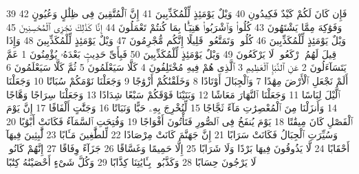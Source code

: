 {\tiny\colorbox{cl_aya}{39}} فَإِن كَانَ لَكُمْ كَيْدٌ فَكِيدُونِ
{\tiny\colorbox{cl_aya}{40}} وَيْلٌ يَوْمَئِذٍ لِّلْمُكَذِّبِينَ
{\tiny\colorbox{cl_aya}{41}} إِنَّ ٱلْمُتَّقِينَ فِى ظِلَٰلٍ وَعُيُونٍ
{\tiny\colorbox{cl_aya}{42}} وَفَوَٰكِهَ مِمَّا يَشْتَهُونَ
{\tiny\colorbox{cl_aya}{43}} كُلُوا۟ وَٱشْرَبُوا۟ هَنِيٓـًٔۢا بِمَا كُنتُمْ تَعْمَلُونَ
{\tiny\colorbox{cl_aya}{44}} إِنَّا كَذَٰلِكَ نَجْزِى ٱلْمُحْسِنِينَ
{\tiny\colorbox{cl_aya}{45}} وَيْلٌ يَوْمَئِذٍ لِّلْمُكَذِّبِينَ
{\tiny\colorbox{cl_aya}{46}} كُلُوا۟ وَتَمَتَّعُوا۟ قَلِيلًا إِنَّكُم مُّجْرِمُونَ
{\tiny\colorbox{cl_aya}{47}} وَيْلٌ يَوْمَئِذٍ لِّلْمُكَذِّبِينَ
{\tiny\colorbox{cl_aya}{48}} وَإِذَا قِيلَ لَهُمُ ٱرْكَعُوا۟ لَا يَرْكَعُونَ
{\tiny\colorbox{cl_aya}{49}} وَيْلٌ يَوْمَئِذٍ لِّلْمُكَذِّبِينَ
{\tiny\colorbox{cl_aya}{50}} فَبِأَىِّ حَدِيثٍۭ بَعْدَهُۥ يُؤْمِنُونَ
{\tiny\colorbox{cl_aya}{1}} عَمَّ يَتَسَآءَلُونَ
{\tiny\colorbox{cl_aya}{2}} عَنِ ٱلنَّبَإِ ٱلْعَظِيمِ
{\tiny\colorbox{cl_aya}{3}} ٱلَّذِى هُمْ فِيهِ مُخْتَلِفُونَ
{\tiny\colorbox{cl_aya}{4}} كَلَّا سَيَعْلَمُونَ
{\tiny\colorbox{cl_aya}{5}} ثُمَّ كَلَّا سَيَعْلَمُونَ
{\tiny\colorbox{cl_aya}{6}} أَلَمْ نَجْعَلِ ٱلْأَرْضَ مِهَٰدًا
{\tiny\colorbox{cl_aya}{7}} وَٱلْجِبَالَ أَوْتَادًا
{\tiny\colorbox{cl_aya}{8}} وَخَلَقْنَٰكُمْ أَزْوَٰجًا
{\tiny\colorbox{cl_aya}{9}} وَجَعَلْنَا نَوْمَكُمْ سُبَاتًا
{\tiny\colorbox{cl_aya}{10}} وَجَعَلْنَا ٱلَّيْلَ لِبَاسًا
{\tiny\colorbox{cl_aya}{11}} وَجَعَلْنَا ٱلنَّهَارَ مَعَاشًا
{\tiny\colorbox{cl_aya}{12}} وَبَنَيْنَا فَوْقَكُمْ سَبْعًا شِدَادًا
{\tiny\colorbox{cl_aya}{13}} وَجَعَلْنَا سِرَاجًا وَهَّاجًا
{\tiny\colorbox{cl_aya}{14}} وَأَنزَلْنَا مِنَ ٱلْمُعْصِرَٰتِ مَآءً ثَجَّاجًا
{\tiny\colorbox{cl_aya}{15}} لِّنُخْرِجَ بِهِۦ حَبًّا وَنَبَاتًا
{\tiny\colorbox{cl_aya}{16}} وَجَنَّٰتٍ أَلْفَافًا
{\tiny\colorbox{cl_aya}{17}} إِنَّ يَوْمَ ٱلْفَصْلِ كَانَ مِيقَٰتًا
{\tiny\colorbox{cl_aya}{18}} يَوْمَ يُنفَخُ فِى ٱلصُّورِ فَتَأْتُونَ أَفْوَاجًا
{\tiny\colorbox{cl_aya}{19}} وَفُتِحَتِ ٱلسَّمَآءُ فَكَانَتْ أَبْوَٰبًا
{\tiny\colorbox{cl_aya}{20}} وَسُيِّرَتِ ٱلْجِبَالُ فَكَانَتْ سَرَابًا
{\tiny\colorbox{cl_aya}{21}} إِنَّ جَهَنَّمَ كَانَتْ مِرْصَادًا
{\tiny\colorbox{cl_aya}{22}} لِّلطَّٰغِينَ مَـَٔابًا
{\tiny\colorbox{cl_aya}{23}} لَّٰبِثِينَ فِيهَآ أَحْقَابًا
{\tiny\colorbox{cl_aya}{24}} لَّا يَذُوقُونَ فِيهَا بَرْدًا وَلَا شَرَابًا
{\tiny\colorbox{cl_aya}{25}} إِلَّا حَمِيمًا وَغَسَّاقًا
{\tiny\colorbox{cl_aya}{26}} جَزَآءً وِفَاقًا
{\tiny\colorbox{cl_aya}{27}} إِنَّهُمْ كَانُوا۟ لَا يَرْجُونَ حِسَابًا
{\tiny\colorbox{cl_aya}{28}} وَكَذَّبُوا۟ بِـَٔايَٰتِنَا كِذَّابًا
{\tiny\colorbox{cl_aya}{29}} وَكُلَّ شَىْءٍ أَحْصَيْنَٰهُ كِتَٰبًا
